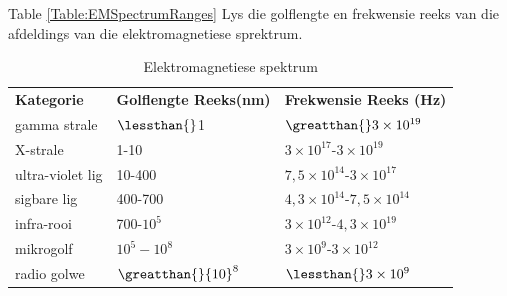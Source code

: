 

      \label{m38778*id187332}Table \ref{Table:EMSpectrumRanges} Lys die golflengte en frekwensie reeks van die afdeldings van die elektromagnetiese sprektrum.\par 
          \begin{table}[H]
        \begin{center}
      \label{m38778*uid8}
    \noindent
    
      \begin{tabular}[t]{|l|l|l|}\hline
                \textbf{Kategorie}
               &
                \textbf{Golflengte Reeks(nm)}
               &
                \textbf{Frekwensie Reeks (Hz)}
     \tabularnewline\cline{1-1}\cline{2-2}\cline{3-3}
        gamma strale &
        $\lessthan{}$1 &
                $\greatthan{}3\ensuremath{\times}{10}^{19}$
     \tabularnewline\cline{1-1}\cline{2-2}\cline{3-3}
        X-strale &
        1-10 &
        $3\ensuremath{\times}{10}^{17}$-$3\ensuremath{\times}{10}^{19}$%
     \tabularnewline\cline{1-1}\cline{2-2}\cline{3-3}
        ultra-violet lig &
        10-400 &
        $7,5\ensuremath{\times}{10}^{14}$-$3\ensuremath{\times}{10}^{17}$%
     \tabularnewline\cline{1-1}\cline{2-2}\cline{3-3}
        sigbare lig &
        400-700 &
        $4,3\ensuremath{\times}{10}^{14}$-$7,5\ensuremath{\times}{10}^{14}$%
     \tabularnewline\cline{1-1}\cline{2-2}\cline{3-3}
        infra-rooi &
        700-${10}^{5}$ &
        $3\ensuremath{\times}{10}^{12}$-$4,3\ensuremath{\times}{10}^{19}$%
     \tabularnewline\cline{1-1}\cline{2-2}\cline{3-3}
        mikrogolf &
                ${10}^{5}-{10}^{8}$
               &
        $3\ensuremath{\times}{10}^{9}$-$3\ensuremath{\times}{10}^{12}$%
     \tabularnewline\cline{1-1}\cline{2-2}\cline{3-3}
        radio golwe &
                $\greatthan{}{10}^{8}$
               &
                $\lessthan{}3\ensuremath{\times}{10}^{9}$
     \tabularnewline\cline{1-1}\cline{2-2}\cline{3-3}
    \end{tabular}
      \end{center}
    \label{table:EMSpectrumRanges}
    \caption{Elektromagnetiese spektrum}
\end{table}
